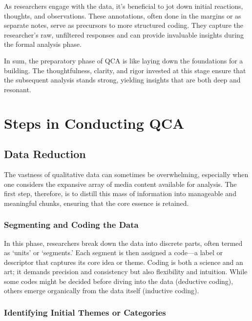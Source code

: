 \documentclass[
  b5paper]{book}
\begin{document}
As researchers engage with the data, it's beneficial to jot down initial reactions, thoughts, and observations. These annotations, often done in the margins or as separate notes, serve as precursors to more structured coding. They capture the researcher's raw, unfiltered responses and can provide invaluable insights during the formal analysis phase.

In sum, the preparatory phase of QCA is like laying down the foundations for a building. The thoughtfulness, clarity, and rigor invested at this stage ensure that the subsequent analysis stands strong, yielding insights that are both deep and resonant.

\hypertarget{steps-in-conducting-qca}{%
\section{Steps in Conducting QCA}\label{steps-in-conducting-qca}}

\hypertarget{data-reduction}{%
\subsection*{Data Reduction}\label{data-reduction}}

The vastness of qualitative data can sometimes be overwhelming, especially when one considers the expansive array of media content available for analysis. The first step, therefore, is to distill this mass of information into manageable and meaningful chunks, ensuring that the core essence is retained.

\hypertarget{segmenting-and-coding-the-data}{%
\subsubsection*{Segmenting and Coding the Data}\label{segmenting-and-coding-the-data}}

In this phase, researchers break down the data into discrete parts, often termed as `units' or `segments.' Each segment is then assigned a code---a label or descriptor that captures its core idea or theme. Coding is both a science and an art; it demands precision and consistency but also flexibility and intuition. While some codes might be decided before diving into the data (deductive coding), others emerge organically from the data itself (inductive coding).

\hypertarget{identifying-initial-themes-or-categories}{%
\subsubsection*{Identifying Initial Themes or Categories}\label{identifying-initial-themes-or-categories}}
\end{document}
